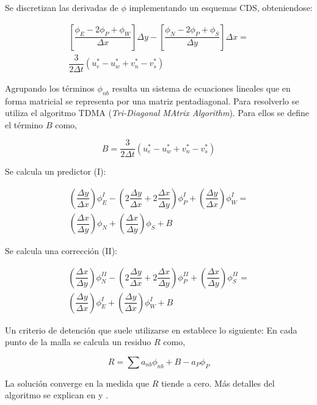 Se discretizan las derivadas de $\phi$ implementando un esquemas CDS, obteniendose:

\begin{equation} \label{poisson_discreto}
\begin{split}
\left[ \dfrac{\phi_E-2\phi_P+\phi_W}{\Delta x} \right] \Delta y - \left[ \dfrac{\phi_N-2\phi_P+\phi_S}{\Delta y} \right] \Delta x = \\ \dfrac{3}{2 \Delta t} \left( u_e^* - u_w^* + v_n^* - v_s^* \right)
\end{split}  
\end{equation}

Agrupando los términos $\phi_{nb}$ resulta un sistema de ecuaciones lineales que en forma matricial se representa por una matriz pentadiagonal. Para resolverlo se utiliza el algoritmo TDMA (\textit{Tri-Diagonal MAtrix Algorithm}). Para ellos se define el término $B$ como,

\begin{equation}
B =  \dfrac{3}{2 \Delta t} \left( u_e^* - u_w^* + v_n^* - v_s^* \right)
\end{equation}

Se calcula un predictor (I):

\begin{equation}
\begin{split}
\left( \dfrac{\Delta y}{\Delta x} \right) \phi_E^I - \left( 2 \dfrac{\Delta y}{\Delta x} + 2 \dfrac{\Delta x}{\Delta y} \right) \phi_P^I + \left( \dfrac{\Delta y}{\Delta x} \right) \phi_W^I = \\ \left( \dfrac{\Delta x}{\Delta y} \right) \phi_N + \left( \dfrac{\Delta x}{\Delta y} \right) \phi_S + B
\end{split}
\end{equation}

Se calcula una corrección (II):

\begin{equation}
\begin{split}
\left( \dfrac{\Delta x}{\Delta y} \right) \phi_N^{II} - \left( 2 \dfrac{\Delta y}{\Delta x} + 2 \dfrac{\Delta x}{\Delta y} \right) \phi_P^{II} + \left( \dfrac{\Delta x}{\Delta y} \right) \phi_S^{II} = \\ \left( \dfrac{\Delta y}{\Delta x} \right) \phi_E^I + \left( \dfrac{\Delta y}{\Delta x} \right) \phi_W^I + B
\end{split}
\end{equation}

Un criterio de detención que suele utilizarse en establece lo siguiente: En cada punto de la malla se calcula un residuo $R$ como,

\begin{equation}
R = \sum a_{nb} \phi_{nb} + B - a_P \phi_P 
\end{equation}

La solución converge en la medida que $R$ tiende a cero. Más detalles del algoritmo se explican en \cite{patankar} y \cite{versteeg}. 
